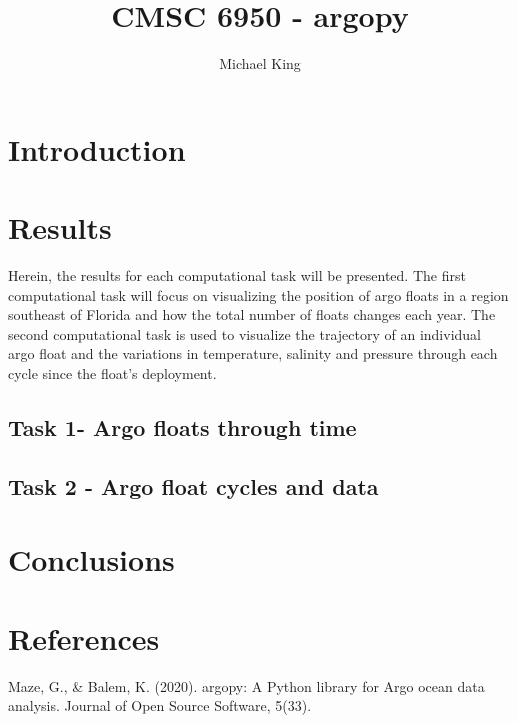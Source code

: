 \documentclass{article}
\title{CMSC 6950 - argopy}
\author{Michael King}
\begin{document}
\maketitle

\section{Introduction}

    

\section{Results}

Herein, the results for each computational task will be presented. The first computational task will focus on visualizing the position of argo floats in a region southeast of Florida and how the total number of floats changes each year. The second computational task is used to visualize the trajectory of an individual argo float and the variations in temperature, salinity and pressure through each cycle since the float's deployment.

\subsection{Task 1- Argo floats through time}

\subsection{Task 2 - Argo float cycles and data}

\section{Conclusions}

\section{References}

Maze, G., & Balem, K. (2020). argopy: A Python library for Argo ocean data analysis. Journal of Open Source Software, 5(33).
\end{document}
